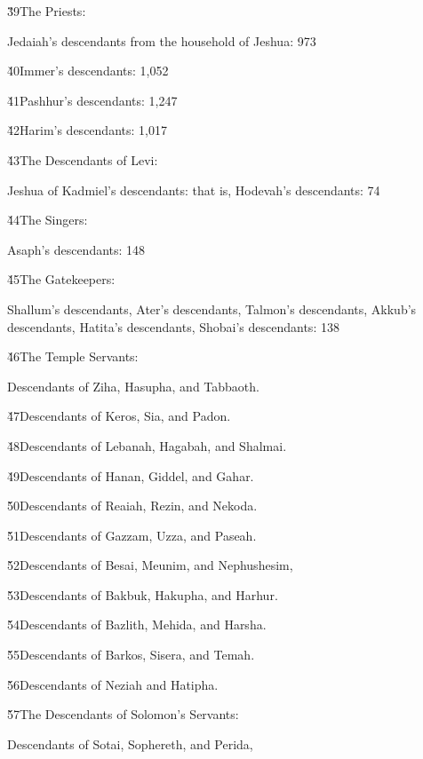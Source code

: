 \v{39}The Priests:

Jedaiah's descendants from the household of Jeshua: 973

\v{40}Immer's descendants: 1,052

\v{41}Pashhur's descendants: 1,247

\v{42}Harim's descendants: 1,017

\v{43}The Descendants of Levi:

Jeshua of Kadmiel's descendants: that is, Hodevah's descendants: 74

\v{44}The Singers:

Asaph's descendants: 148

\v{45}The Gatekeepers:

Shallum's descendants, Ater's descendants, Talmon's descendants, Akkub's descendants, Hatita's descendants, Shobai's descendants: 138

\v{46}The Temple Servants:

Descendants of Ziha, Hasupha, and Tabbaoth.

\v{47}Descendants of Keros, Sia, and Padon.

\v{48}Descendants of Lebanah, Hagabah, and Shalmai.

\v{49}Descendants of Hanan, Giddel, and Gahar.

\v{50}Descendants of Reaiah, Rezin, and Nekoda.

\v{51}Descendants of Gazzam, Uzza, and Paseah.

\v{52}Descendants of Besai, Meunim, and Nephushesim,

\v{53}Descendants of Bakbuk, Hakupha, and Harhur.

\v{54}Descendants of Bazlith, Mehida, and Harsha.

\v{55}Descendants of Barkos, Sisera, and Temah.

\v{56}Descendants of Neziah and Hatipha.

\v{57}The Descendants of Solomon's Servants:

Descendants of Sotai, Sophereth, and Perida,

